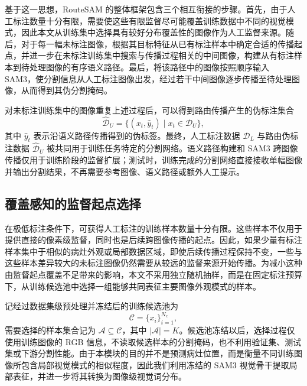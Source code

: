 \documentclass[UTF8,a4paper,10pt]{ctexart}
\begin{document}
基于这一思想，RouteSAM 的整体框架包含三个相互衔接的步骤。首先，由于人工标注数量十分有限，需要使这些有限监督尽可能覆盖训练数据中不同的视觉模式，因此本文从训练集中选择具有较好分布覆盖性的图像作为人工监督来源。随后，对于每一幅未标注图像，根据其目标特征从已有标注样本中确定合适的传播起点，并进一步在未标注训练集中搜索与传播过程相关的中间图像，构建从有标注样本到待处理图像的有序语义路径。最后，将该路径中的图像按照顺序输入 SAM3，使分割信息从人工标注图像出发，经过若干中间图像逐步传播至待处理图像，从而得到其伪分割掩码。

对未标注训练集中的图像重复上述过程后，可以得到路由传播产生的伪标注集合
\[
\widehat{\mathcal{D}}_{U}
=
\{(x_t,\hat y_t)\mid x_t\in\mathcal D_U\},
\]
其中 \(\hat y_t\) 表示沿语义路径传播得到的伪标签。最终，人工标注数据 \(\mathcal D_L\) 与路由伪标注数据 \(\widehat{\mathcal D}_U\) 被共同用于训练任务特定的分割网络。语义路径构建和 SAM3 跨图像传播仅用于训练阶段的监督扩展；测试时，训练完成的分割网络直接接收单幅图像并输出分割结果，不再需要参考图像、语义路径或额外人工提示。






\subsection{覆盖感知的监督起点选择}
\label{sec:coverage-aware-selection-zh}

在极低标注条件下，可获得人工标注的训练样本数量十分有限。这些样本不仅用于提供直接的像素级监督，同时也是后续跨图像传播的起点。因此，如果少量有标注样本集中于相似的病灶外观或局部数据区域，即使后续传播过程保持不变，一些与这些样本差异较大的未标注图像仍然需要从较远的监督来源开始传播。为减小这种由监督起点覆盖不足带来的影响，本文不采用独立随机抽样，而是在固定标注预算下，从训练候选池中选择一组能够共同表征主要图像外观模式的样本。

记经过数据集级预处理并冻结后的训练候选池为
\begin{equation}
\mathcal{C}=\{x_i\}_{i=1}^{N_c},
\end{equation}
需要选择的样本集合记为 $\mathcal{A}\subseteq\mathcal{C}$，其中 $|\mathcal{A}|=K$。候选池冻结以后，选择过程仅使用训练图像的 RGB 信息，不读取候选样本的分割掩码，也不利用验证集、测试集或下游分割性能。由于本模块的目的并不是预测病灶位置，而是衡量不同训练图像所包含局部视觉模式的相似程度，因此我们利用冻结的 SAM3 视觉骨干提取局部表征，并进一步将其转换为图像级视觉词分布。
\end{document}
